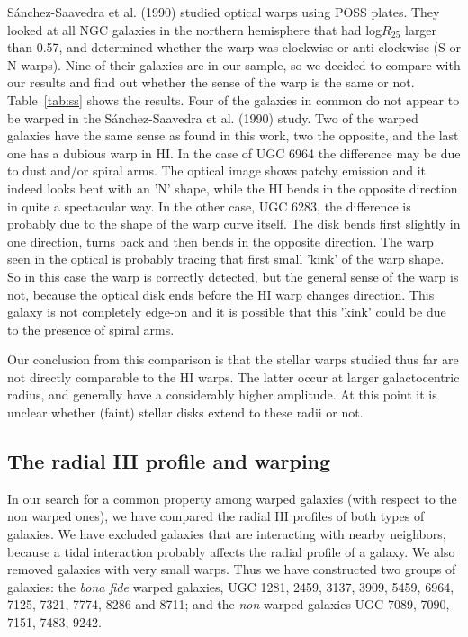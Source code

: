 \documentclass{aa}
\begin{document}
S\'anchez-Saavedra et al. (1990) studied optical warps using POSS
plates. They looked at all NGC galaxies in the northern hemisphere
that had log$R_{25}$ larger than 0.57, and determined
whether the warp was clockwise 
or anti-clockwise (S or N warps). Nine of their galaxies are in our
sample, so we decided to compare with our results and find out whether
the sense of the warp 
is the same or not. Table~\ref{tab:ss} shows the results. Four of the
galaxies in common do not appear to be warped in the S\'anchez-Saavedra et al.
(1990) study. Two of the warped galaxies have the same sense as
found in
this work, two the opposite, and the last one has a dubious warp in
HI. In the case of UGC 6964 the
difference may be due to dust and/or spiral arms. The optical image
shows patchy emission and it indeed looks bent with an 'N' shape, while
the HI bends in the opposite direction in quite a spectacular
way. In the other case, UGC 6283, the difference is probably due
to the shape of the warp curve itself. The disk bends first slightly in one
direction, turns back and then bends in the opposite
direction. The warp seen in the optical is probably tracing that first
small 'kink' of the warp shape. So in this case the warp is correctly
detected, but the general sense of the warp is not, because the
optical disk ends
before the HI warp changes direction. This galaxy is not completely
edge-on and it is possible that this 'kink' could be due to the
presence of spiral arms.  

Our conclusion from this comparison is that the stellar warps studied
thus far are not directly comparable to the HI warps. The latter occur
at larger galactocentric radius, and generally have a considerably
higher amplitude. At this point it is unclear whether (faint) stellar
disks extend to these radii or not.

\subsection{The radial HI profile and warping}
\label{radial}

In our search for a common property among warped galaxies (with respect to
the non warped ones), we have compared
the radial HI profiles of both types of galaxies. We have excluded galaxies that are 
interacting with nearby neighbors, because a tidal interaction probably
affects the radial profile of a galaxy. We also removed galaxies with very small
warps. Thus we have constructed two groups of galaxies: the
{\em bona fide} warped galaxies, UGC 1281, 2459, 3137,
3909, 5459, 6964, 7125, 7321, 7774, 8286 and 8711; and the {\em
  non}-warped galaxies UGC 7089, 7090, 7151, 7483, 9242.
\end{document}
